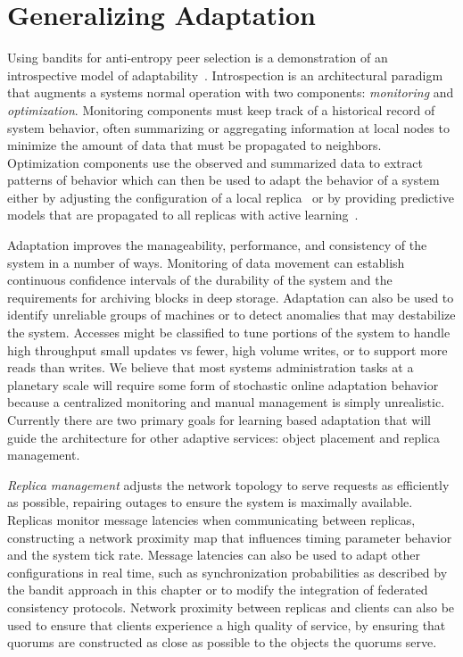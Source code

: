 \section{Generalizing Adaptation}
\label{ch06_generalizing_adaptation}


Using bandits for anti-entropy peer selection is a demonstration of an introspective model of adaptability~\cite{oceanstore}.
Introspection is an architectural paradigm that augments a systems normal operation with two components: \emph{monitoring} and \emph{optimization}.
Monitoring components must keep track of a historical record of system behavior, often summarizing or aggregating information at local nodes to minimize the amount of data that must be propagated to neighbors.
Optimization components use the observed and summarized data to extract patterns of behavior which can then be used to adapt the behavior of a system either by adjusting the configuration of a local replica~\cite{oates_investigating_1998} or by providing predictive models that are propagated to all replicas with active learning~\cite{kalai_efficient_2005,osugi_balancing_2005}.

Adaptation improves the manageability, performance, and consistency of the system in a number of ways.
Monitoring of data movement can establish continuous confidence intervals of the durability of the system and the requirements for archiving blocks in deep storage.
Adaptation can also be used to identify unreliable groups of machines or to detect anomalies that may destabilize the system.
Accesses might be classified to tune portions of the system to handle high throughput small updates vs fewer, high volume writes, or to support more reads than writes.
We believe that most systems administration tasks at a planetary scale will require some form of stochastic online adaptation behavior because a centralized monitoring and manual management is simply unrealistic.
Currently there are two primary goals for learning based adaptation that will guide the architecture for other adaptive services: object placement and replica management.

\emph{Replica management} adjusts the network topology to serve requests as efficiently as possible, repairing outages to ensure the system is maximally available.
Replicas monitor message latencies when communicating between replicas, constructing a network proximity map that influences timing parameter behavior and the system tick rate.
Message latencies can also be used to adapt other configurations in real time, such as synchronization probabilities as described by the bandit approach in this chapter or to modify the integration of federated consistency protocols.
Network proximity between replicas and clients can also be used to ensure that clients experience a high quality of service, by ensuring that quorums are constructed as close as possible to the objects the quorums serve.

